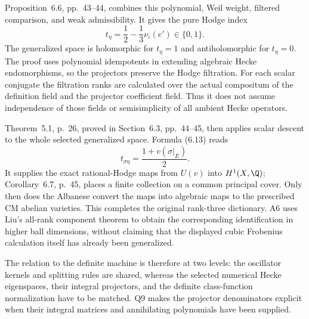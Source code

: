 Proposition~6.6, pp.~43--44, combines this polynomial, Weil weight,
filtered comparison, and weak admissibility. It gives the pure
Hodge index
\[
 t_\eta=\frac12-\frac13\nu_\iota(e')\in\{0,1\}.
\]
The generalized space is holomorphic for $t_\eta=1$ and
antiholomorphic for $t_\eta=0$. The proof uses polynomial
idempotents in extending algebraic Hecke endomorphisms, so the
projectors preserve the Hodge filtration. For each scalar
conjugate the filtration ranks are calculated over the actual
compositum of the definition field and the projector coefficient
field. Thus it does not assume independence of those fields or
semisimplicity of all ambient Hecke operators.

Theorem~5.1, p.~26, proved in Section~6.3, pp.~44--45, then applies
scalar descent to the whole selected generalized space. Formula
(6.13) reads
\[
 t_{\sigma\eta}=\frac{1+v(\sigma|_E)}2.
\]
It supplies the exact rational-Hodge maps from $U(v)$ into
$H^1(X,\Q)$; Corollary~6.7, p.~45, places a finite collection
on a common principal cover. Only then does the Albanese convert
the maps into algebraic maps to the prescribed CM abelian varieties.
This completes the original rank-three dictionary. A6 uses Liu's
all-rank component theorem to obtain the corresponding identification
in higher ball dimensions, without claiming that the displayed
cubic Frobenius calculation itself has already been generalized.

The relation to the definite machine is therefore at two levels:
the oscillator kernels and splitting rules are shared, whereas the
selected numerical Hecke eigenspaces, their integral projectors,
and the definite class-function normalization have to be matched.
Q9 makes the projector denominators explicit when their integral
matrices and annihilating polynomials have been supplied.
